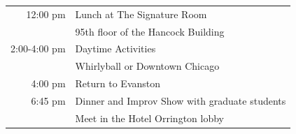 \documentclass[7pt]{article}
\begin{document}
\begin{tabular}[8cm]{ r   l }
    12:00 pm&Lunch at The Signature Room \rule{0cm}{0.4cm}\\ 

    & 95th floor of the Hancock Building\rule{0cm}{0.4cm}\\ 

    2:00-4:00 pm& Daytime Activities\rule{0cm}{0.4cm}\\ 

    & Whirlyball or Downtown Chicago\\ 

    4:00 pm&Return to Evanston\rule{0cm}{0.4cm}\\ 

    6:45 pm&Dinner and Improv Show with graduate students \rule{0cm}{0.4cm}\\ 

    &\indent Meet in the Hotel Orrington lobby\\ 

\end{tabular}
\end{document}
